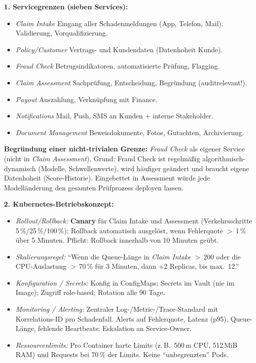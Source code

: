 \documentclass[11pt,a4paper,oneside]{article}
\begin{document}
\begin{loesungbox}
\textbf{1. Servicegrenzen (sieben Services):}

\smallskip
\begin{itemize}
  \item \emph{Claim Intake} \textendash{} Eingang aller Schadenmeldungen (App, Telefon, Mail). Validierung, Vorqualifizierung.
  \item \emph{Policy/Customer} \textendash{} Vertrags- und Kundendaten (Datenhoheit Kunde).
  \item \emph{Fraud Check} \textendash{} Betrugsindikatoren, automatisierte Pr\"ufung, Flagging.
  \item \emph{Claim Assessment} \textendash{} Sachpr\"ufung, Entscheidung, Begr\"undung (auditrelevant!).
  \item \emph{Payout} \textendash{} Auszahlung, Verkn\"upfung mit Finance.
  \item \emph{Notifications} \textendash{} Mail, Push, SMS an Kunden + interne Stakeholder.
  \item \emph{Document Management} \textendash{} Beweisdokumente, Fotos, Gutachten, Archivierung.
\end{itemize}

\smallskip
\textbf{Begr\"undung einer nicht-trivialen Grenze:} \emph{Fraud Check} als eigener Service (nicht in \emph{Claim Assessment}). Grund: Fraud Check ist regelm\"a{\ss}ig algorithmisch-dynamisch (Modelle, Schwellenwerte), wird h\"aufiger ge\"andert und braucht eigene Datenhoheit (Score-Historie). Eingebettet in Assessment w\"urde jede Modell\"anderung den gesamten Pr\"ufprozess deployen lassen.

\smallskip
\textbf{2. Kubernetes-Betriebskonzept:}
\begin{itemize}
  \item \emph{Rollout/Rollback:} \textbf{Canary} f\"ur Claim Intake und Assessment (Verkehrsschritte 5\,\%/25\,\%/100\,\%); Rollback automatisch ausgel\"ost, wenn Fehlerquote $>$\,1\,\% \"uber 5 Minuten. Pflicht: Rollback innerhalb von 10 Minuten ge\"ubt.
  \item \emph{Skalierungsregel:} ``Wenn die Queue-L\"ange in \emph{Claim Intake} $>$\,200 oder die CPU-Auslastung $>$\,70\,\% f\"ur 3 Minuten, dann +2 Replicas, bis max.\ 12.''
  \item \emph{Konfiguration / Secrets:} Konfig in ConfigMaps; Secrets im Vault (nie im Image); Zugriff role-based; Rotation alle 90 Tage.
  \item \emph{Monitoring / Alerting:} Zentraler Log-/Metric-/Trace-Standard mit Korrelations-ID pro Schadenfall. Alerts auf Fehlerquote, Latenz (p95), Queue-L\"ange, fehlende Heartbeats; Eskalation an Service-Owner.
  \item \emph{Ressourcenlimits:} Pro Container harte Limits (z.\,B.\ 500\,m CPU, 512\,MiB RAM) und Requests bei 70\,\% der Limits. Keine ``unbegrenzten'' Pods.
\end{itemize}
\end{loesungbox}
\end{document}
